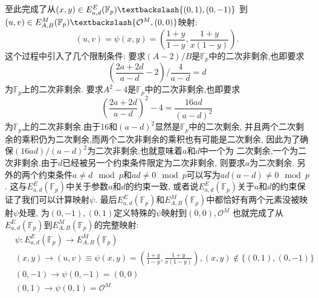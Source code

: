 \documentclass{article}
\newcommand{\F}{\mathbb{F}}
\begin{document}
至此完成了从$(x,y) \in E_{a,d}^E(\F_p) \textbackslash \{(0,1), (0,-1)\}$
到$(u,v) \in E_{A,B}^M(\F_p) \textbackslash \{\mathcal{O}^M, (0,0)\}$映射:
$$(u,v) = \psi(x,y) = \left( \frac{1+y}{1-y}, \frac{1+y}{x(1-y)} \right).$$
这个过程中引入了几个限制条件: 
要求$(A -2)/B$是$\F_p$中的二次非剩余,也即要求
$$
\left(\frac{2a+2d}{a-d} - 2\right) / \frac{4}{a-d} = d
$$
为$\F_p$上的二次非剩余.
要求$A^2-4$是$\F_p$中的二次非剩余,也即要求
$$
\left(\frac{2a+2d}{a-d}\right)^2 - 4 = \frac{16ad}{(a-d)^2}
$$
为$\F_p$上的二次非剩余.由于16和$(a-d)^2$显然是$\F_p$中的二次剩余,
并且两个二次剩余的乘积仍为二次剩余,而两个二次非剩余的乘积也有可能是二次剩余,
因此为了确保$(16ad)/(a-d)^2$为二次非剩余,也就意味着$a$和$d$中一个为
二次剩余,一个为二次非剩余.由于$d$已经被另一个约束条件限定为二次非剩余,
则要求$a$为二次剩余.
另外的两个约束条件$a\neq d\mod p$和$ad\neq 0\mod p$可以写为$ad(a-d)\neq 0\mod p$.
这与$E_{a,d}^E(\F_p)$中关于参数$a$和$d$的约束一致,
或者说$E_{a,d}^E(\F_p)$关于$a$和$d$的约束保证了我们可以计算映射$\psi$.
最后$E_{a,d}^E(\F_p)$和$E_{A,B}^M(\F_p)$中都恰好有两个元素没被映射$\psi$处理,
为$(0,-1), (0,1)$定义特殊的$\psi$映射到$(0,0), \mathcal{O}^M$
也就完成了从$E_{a,d}^E(\F_p)$到$E_{A,B}^M(\F_p)$的完整映射:
\begin{equation*}
\begin{array}{cc}
& \psi:  E_{a,d}^E(\F_p) \rightarrow E_{A,B}^M(\F_p) \\
& (x,y) \rightarrow (u,v) \equiv \psi(x,y) = \left(\frac{1+y}{1-y}, \frac{1+y}{x(1-y)}\right), (x,y)\notin \{(0,1),(0,-1)\}\\
& (0,-1) \rightarrow \psi(0, -1) = (0,0) \\
& (0, 1) \rightarrow \psi(0,1) = \mathcal{O}^M
\end{array}
\end{equation*}
\end{document}
